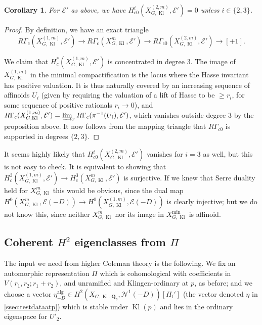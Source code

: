 \documentclass[cjm]{ipart}
\theoremstyle{plain}
\newtheorem{corollary}[theorem]{Corollary}
\theoremstyle{remark}
\DeclareMathOperator{\Kl}{Kl}
\newcommand{\Pif}{\Pi_{\mathrm{f}}}
\newcommand{\QQ}{\mathbf{Q}}
\newcommand{\Qp}{\QQ_p}
\newcommand{\cE}{\mathcal{E}}
\newcommand{\cN}{\mathcal{N}}
\numberwithin{equation}{subsection}
\renewcommand{\ge}{\geqslant}
\begin{document}
  \begin{corollary}
   \label{cor:c0vanish}
   For $\cE'$ as above, we have $H^i_{c0}(X_{G,\Kl}^{(2, m)}, \cE') = 0$ unless $i \in \{2, 3\}$.
  \end{corollary}

  \begin{proof}
   By definition, we have an exact triangle
   \[ R\Gamma_{c}(X_{G,\Kl}^{(1, m)}, \cE') \to R\Gamma_c(X_{G,\Kl}^m, \cE') \to R\Gamma_{c0}(X_{G,\Kl}^{(2, m)}, \cE') \to [+1]. \]

   We claim that $H^*_{c}(X_{G,\Kl}^{(1, m)}, \cE')$ is concentrated in degree 3. The image of $X_{G,\Kl}^{(1, m)}$ in the minimal compactification is the locus where the Hasse invariant has positive valuation. It is thus naturally covered by an increasing sequence of affinoids $U_i$ (given by requiring the valuation of a lift of Hasse to be $\ge r_i$, for some sequence of positive rationals $r_i \to 0$), and $R\Gamma_{c}(X_{G,\Kl}^{(1, m)}, \cE') = \varinjlim_r R\Gamma_c(\pi^{-1}(U_i), \cE')$, which vanishes outside degree 3 by the proposition above. It now follows from the mapping triangle that $R\Gamma_{c0}$ is supported in degrees $\{2, 3\}$.
  \end{proof}

  \begin{remark}
   It seems highly likely that $H^i_{c0}(X_{G,\Kl}^{(2, m)}, \cE')$ vanishes for $i = 3$ as well, but this is not easy to check. It is equivalent to showing that $H^3_c(X_{G,\Kl}^{(1, m)}, \cE') \to H^3_c(X_{G,\Kl}^m, \cE')$ is surjective. If we knew that Serre duality held for $X_{G,\Kl}^m$ this would be obvious, since the dual map $H^0(X_{G,\Kl}^m, \cE(-D)) \to H^0(X_{G,\Kl}^{(1, m)}, \cE(-D))$ is clearly injective; but we do not know this, since neither $X_{G,\Kl}^m$ nor its image in $X_{G,\Kl}^{\min}$ is affinoid.
  \end{remark}


   \subsection{Coherent $H^2$ eigenclasses from $\Pi$}\label{sect:coherentfromPi}

   The input we need from higher Coleman theory is the following. We fix an automorphic representation $\Pi$ which is cohomological with coefficients in $V(r_1, r_2; r_1 + r_2)$, and unramified and Klingen-ordinary at $p$, as before; and we choose a vector $\eta^{\mathrm{alg}}_{-D} \in H^2\left(X_{G, \Kl, \Qp}, \cN^1(-D)\right)[\Pif']$ (the vector denoted $\eta$ in \cref{ssec:testdataatp}) which is stable under $\Kl(p)$ and lies in the ordinary eigenspace for $U'_2$.
\end{document}
